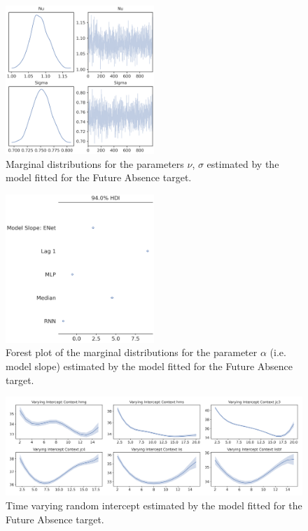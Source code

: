\begin{figure}[ht]
\centering
\includegraphics[width=0.5\textwidth]{images/appendix_C/collapsed_marginals_2.png}
\caption[\textbf{Targets collapsed marginal distributions}]{Marginal distributions for the parameters $\nu$, $\sigma$ estimated by the model fitted for the Future Absence target.}
\label{marginals_coll_2}
\end{figure}
\FloatBarrier

\begin{figure}[ht]
\centering
\includegraphics[width=0.5\textwidth]{images/appendix_C/collapsed_models_2.png}
\caption[\textbf{Targets collapsed model fixed effect}]{Forest plot of the marginal distributions for the parameter $\alpha$ (i.e. model slope) estimated by the model fitted for the Future Absence target.}
\label{model_coll_2}
\end{figure}
\FloatBarrier

\begin{figure}[ht]
\centering
\includegraphics[width=\textwidth]{images/appendix_C/collapsed_interc_2.png}
\caption[\textbf{Targets collapsed time-varying random intercept}]{Time varying random intercept estimated by the model fitted for the Future Absence target.}
\label{interc_coll_2}
\end{figure}
\FloatBarrier

